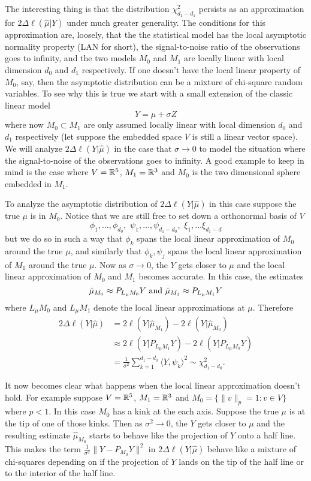 \documentclass[11pt]{report}
\begin{document}
The interesting thing is that the distribution $\chi^2_{d_1 - d_1}$ persists as an approximation for $2\Delta \ell(\hat\mu|Y)$  under much greater generality. The conditions for this approximation  are, loosely, that the the statistical model has the local asymptotic normality property (LAN for short), the signal-to-noise ratio of the observations goes to infinity, and the two models $M_0$ and $M_1$ are locally linear with local dimension $d_0$ and $d_1$ respectively. If one doesn't have the local linear property of $M_0$, say, then the asymptotic distribution can be a mixture of chi-square random variables.
To see why this is true we start with a small extension of the classic linear model
\[ Y= \mu + {\sigma} Z \]
where now $ M_0\subset M_1$ are  only assumed locally linear  with local dimension $d_0$ and $d_1$ respectively (let suppose the embedded space $V$ is still a linear vector space). We will analyze  $2\Delta \ell(Y|\hat\mu)$  in the case that $\sigma\rightarrow 0$  to model the situation where the signal-to-noise of the observations goes to infinity.  A good example to keep in mind is  the case where  $V=\Bbb R^5$, $M_1=\Bbb R^3$ and $M_0$ is the two dimensional sphere embedded in $M_1$. 

To analyze the asymptotic distribution of $2\Delta \ell(Y|\hat\mu)$ in this case suppose the true $\mu$ is in  $ M_0$.
Notice that we are still free to set down a orthonormal basis of $V$
\[\phi_1,\ldots, \phi_{d_0},\,\, \psi_{1},\ldots, \psi_{d_1 - d_0},\,\, \xi_1,\ldots \xi_{d_1 - d}\]
but we do so in such a way that ${\phi_k}$ spans the local linear approximation of $M_0$ around the true $\mu$, and similarly that ${\phi_k, \psi_j}$ spans the local linear approximation of $M_1$ around the true $\mu$.
Now as $\sigma\rightarrow 0$, the $Y$ gets closer to $\mu$ and the local linear approximation of $M_0$ and $M_1$ becomes accurate. In this case, the estimates
\[ \text{$\hat\mu_{\tiny M_0}\approx P_{L_\mu M_0} Y$ and $\hat\mu_{\tiny M_1}\approx P_{L_\mu M_1} Y$}\]
 where $L_\mu M_0$ and $L_\mu M_1$ denote the local linear approximations at $\mu$. Therefore
\begin{align*}
2\Delta \ell(Y|\hat\mu) 
&= 2\ell(Y|\hat\mu_{M_1}) - 2\ell(Y|\hat\mu_{M_0}) \\
&\approx 2\ell(Y|P_{L_\mu M_1}Y) - 2\ell(Y|P_{L_\mu M_0}Y) \\
 &= \frac{1}{\sigma^2}  \sum_{k=1}^{d_1-d_0}{\langle Y,\psi_k \rangle^2} \sim \chi^2_{d_1 - d_0}.
\end{align*}


It now becomes clear what happens when the local linear approximation doesn't hold. For example suppose $V=\Bbb R^5$, $M_1=\Bbb R^3$ and $M_0=\{ \|v\|_p=1: v\in V\}$ where $p<1$. In this case $M_0$ has a kink at the each axis. Suppose the true $\mu$ is at the tip of one of those kinks. Then as $\sigma^2\rightarrow 0$, the $Y$ gets closer to $\mu$ and the resulting estimate $\hat\mu_{M_0}$ starts to behave like the projection of $Y$ onto a half line. This makes the term $\frac{1}{\sigma^2} \|Y - P_{M_0}Y \|^2$ in $2\Delta \ell(Y|\hat\mu) $ behave like a mixture of chi-squares depending on if the projection of $Y$ lands on the tip of the half line or to the interior of the half line. 
\end{document}
